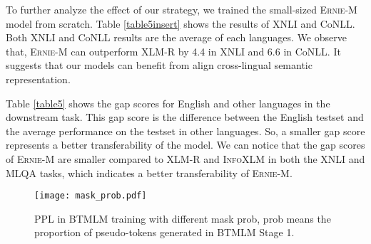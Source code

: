 \documentclass[11pt]{article}
\begin{document}
To further analyze the effect of our strategy, we trained the small-sized \textsc{Ernie-M} model from scratch. Table \ref{table5insert} shows the results of XNLI and CoNLL. Both XNLI and CoNLL results are the average of each languages. We observe that, \textsc{Ernie-M} can outperform XLM-R by 4.4 in XNLI and 6.6 in CoNLL. It suggests that our models can benefit from align cross-lingual semantic representation.

\begin{table}[!h]
\centering
\vskip 0.1in

\caption{XNLI and CoNLL accuracy under the cross-lingual transfer setting. All the models are small-sized trained from scratch. The small-sized model has the same hyperparameter as base model except that the number of layers is 6. \textsc{Ernie-M} is the result in downstream tasks with the same computational overhead as XLM-R. All the models have the same training steps except \textsc{Ernie-M}.}
\label{table5insert}
\end{table}


Table \ref{table5} shows the gap scores for English and other languages in the downstream task. This gap score is the difference between the English testset and the average performance on the testset in other languages. So, a smaller gap score represents a better transferability of the model. We can notice that the gap scores of \textsc{Ernie-M} are smaller compared to XLM-R and \textsc{InfoXLM} in both the XNLI and MLQA tasks, which indicates a better transferability of \textsc{Ernie-M}.

\begin{figure}[!htp]
\centering
\texttt{[image: mask\_prob.pdf]}
\vskip -0.05in
\caption{PPL in BTMLM training with different mask prob, prob means the proportion of pseudo-tokens generated in BTMLM Stage 1.}
\label{fig6}
\end{figure}
\vskip -0.05in
\end{document}
